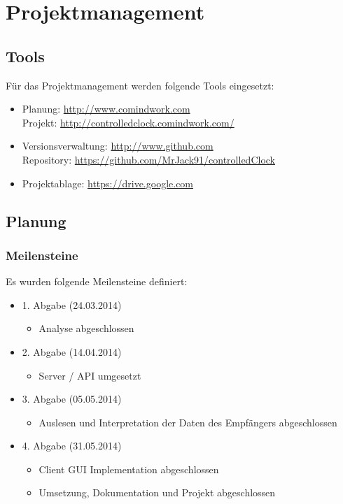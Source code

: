 
\chapter{Projektmanagement}




\section{Tools}
Für das Projektmanagement werden folgende Tools eingesetzt:
\begin{itemize}
\item Planung: \url{http://www.comindwork.com}\\
Projekt: \url{http://controlledclock.comindwork.com/}
\item Versionsverwaltung: \url{http://www.github.com}\\
Repository: \url{https://github.com/MrJack91/controlledClock}
\item Projektablage: \url{https://drive.google.com}
\end{itemize}


\section{Planung}

\subsection{Meilensteine}
Es wurden folgende Meilensteine definiert:

\begin{itemize}
\item 1. Abgabe (24.03.2014)
	\begin{itemize}
	\item Analyse abgeschlossen
	\end{itemize}
\item 2. Abgabe (14.04.2014)
	\begin{itemize}
	\item Server / API umgesetzt
	\end{itemize}
\item 3. Abgabe (05.05.2014)
	\begin{itemize}
	\item Auslesen und Interpretation der Daten des Empfängers abgeschlossen
	\end{itemize}
\item 4. Abgabe (31.05.2014)
	\begin{itemize}
	\item Client GUI Implementation abgeschlossen
	\item Umsetzung, Dokumentation und Projekt abgeschlossen
	\end{itemize}
\end{itemize}

